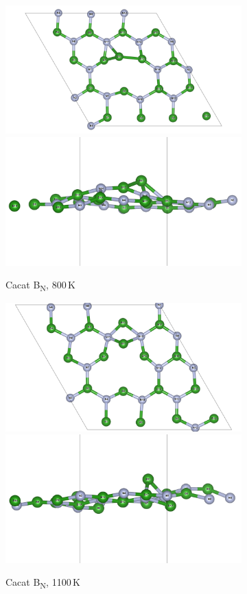 \begin{figure}[htbp]\ContinuedFloat
  \centering
  \begin{subfigure}{\textwidth}
    \centering
    \includegraphics[width=0.49\linewidth]{gambar_hasil/hBN_BB_800K.png}\hfill
    \includegraphics[width=0.49\linewidth]{gambar_hasil/hBN_BB_side_800K.png}
    \caption{Cacat B\textsubscript{N}, 800 K}
    \label{subfig:md_bb_800k}
  \end{subfigure}
  \vspace{1em}
  \begin{subfigure}{\textwidth}
    \centering
    \includegraphics[width=0.49\linewidth]{gambar_hasil/hBN_BB_1100K.png}\hfill
    \includegraphics[width=0.49\linewidth]{gambar_hasil/hBN_BB_side_1100K.png}
    \caption{Cacat B\textsubscript{N}, 1100 K}
    \label{subfig:md_bb_1100k}
  \end{subfigure}
  \vspace{1em}
  \begin{subfigure}{\textwidth}

\end{subfigure}
\end{figure}
